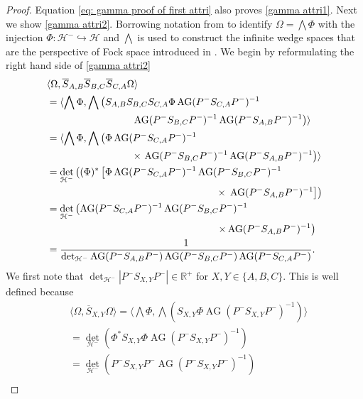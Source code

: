 \documentclass[b5paper,draft,openbib,12pt]{memoir}
\DeclareMathOperator{\AG}{AG}
\begin{document}
\begin{proof}
 Equation 
\eqref{eq: gamma proof of first attri} also proves \eqref{gamma attri1}. Next we show \eqref{gamma attri2}. 
Borrowing notation from \cite[section 2]{ivp0} to identify \(\Omega=\bigwedge \Phi\) with the injection \(\Phi: \mathcal{H}^-\hookrightarrow\mathcal{H}\)
and \(\bigwedge\) is used to construct the infinite wedge spaces that are the perspective of Fock space introduced in \cite{ivp0}. 
We begin by reformulating the right hand side of  \eqref{gamma attri2}
\begin{align}
 &\langle \Omega, \overline{S}_{A,B} \overline{S}_{B,C} \overline{S}_{C,A}\Omega\rangle \\\notag
&=\langle \bigwedge \Phi, \bigwedge \left(S_{A,B}S_{B,C}S_{C,A}\Phi \AG(P^-S_{C,A} P^-)^{-1}\right.\\\notag
&\hspace{3cm}\left. \AG(P^-S_{B,C} P^-)^{-1} \AG(P^-S_{A,B} P^-)^{-1}  \right)\rangle \\
&=\langle \bigwedge \Phi, \bigwedge \left(\Phi \AG(P^-S_{C,A} P^-)^{-1}\right.\\\notag
&\hspace{3cm}\times\left. \AG(P^-S_{B,C} P^-)^{-1} \AG(P^-S_{A,B} P^-)^{-1}  \right)\rangle \\
&=\det_{\mathcal{H}^-}\left( (\Phi)^*  \left[\Phi \AG(P^- S_{C,A} P^-)^{-1} \AG(P^-S_{B,C} P^-)^{-1}\right.\right.\\\notag
&\hspace{6cm}\times\left.\left. \AG(P^-S_{A,B} P^-)^{-1} \right] \right)\\
&=\det_{\mathcal{H}^-}  \left(\AG(P^- S_{C,A} P^-)^{-1} \AG(P^- S_{B,C} P^-)^{-1}\right.\\ \notag
&\hspace{6cm}\left.\times\AG(P^-S_{A,B} P^-)^{-1}\right)  \\\label{eq:1/arg}
&=\frac{1}{\det_{\mathcal{H}^-}  \AG(P^- S_{A,B} P^-) \AG(P^- S_{B,C} P^-) \AG(P^-S_{C,A} P^-) }.
\end{align}
We first note that \(\det_{\mathcal{H}^-}|P^- S_{X,Y}P^-|\in\mathbb{R}^+\) for \(X,Y\in \{A,B,C\}\). This is well defined because 
\begin{align}
&\langle \Omega, \overline{S}_{X,Y}\Omega\rangle
=\langle \bigwedge \Phi, \bigwedge(S_{X,Y}\Phi \AG(P^- S_{X,Y}P^-)^{-1})\rangle\\
&=\det_{\mathcal{H}^-} \left( \Phi^* S_{X,Y}\Phi \AG(P^- S_{X,Y}P^-)^{-1}\right)\\
&=\det_{\mathcal{H}^-} \left( P^- S_{X,Y} P^- \AG(P^- S_{X,Y}P^-)^{-1}\right)\\

\end{align}
\end{proof}
\end{document}

